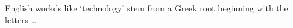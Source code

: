 \documentclass{article}
\begin{document}
\raggedright
English workds like `technology' stem from a Greek root 
beginning with the letters \dots
\end{document}
